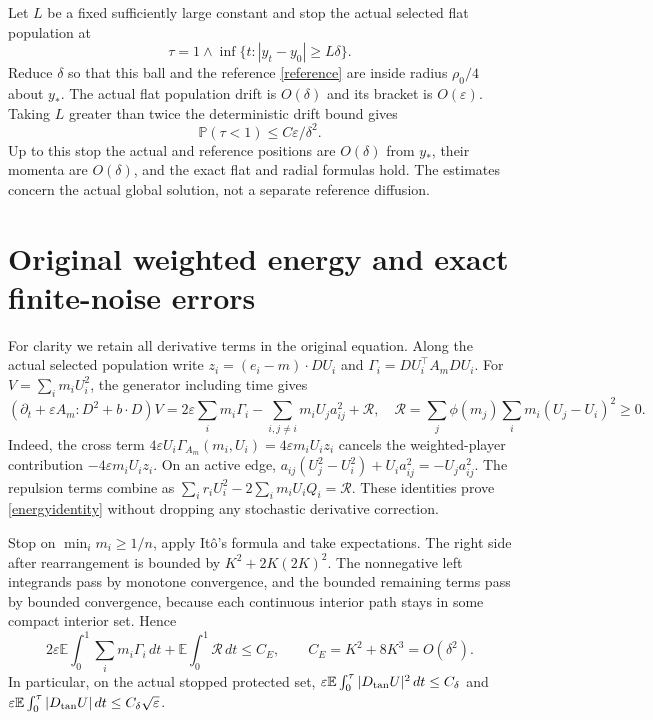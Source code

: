 \documentclass[11pt,a4paper]{article}
\newcommand{\E}{\mathbb E}
\newcommand{\PP}{\mathbb P}
\newcommand{\dt}{\,dt}
\begin{document}
Let $L$ be a fixed sufficiently large constant and stop the actual
selected flat population at
\[
 \tau=1\wedge\inf\{t:|y_t-y_0|\geq L\delta\}.
\]
Reduce $\delta$ so that this ball and the reference
\eqref{reference} are inside radius $\rho_0/4$ about $y_*$.
The actual flat population drift is $O(\delta)$ and its bracket is
$O(\varepsilon)$. Taking $L$ greater than twice the deterministic
drift bound gives
\begin{equation}\label{localexit}
 \PP(\tau<1)\leq C\varepsilon/\delta^2.
\end{equation}
Up to this stop the actual and reference positions are $O(\delta)$
from $y_*$, their momenta are $O(\delta)$, and the exact flat and
radial formulas hold. The estimates concern the actual global
solution, not a separate reference diffusion.

\section{Original weighted energy and exact finite-noise errors}
For clarity we retain all derivative terms in the original equation.
Along the actual selected population write
$z_i=(e_i-m)\cdot DU_i$ and
$\Gamma_i=DU_i^\top A_mDU_i$. For
$V=\sum_i m_iU_i^2$, the generator including time gives
\begin{equation}\label{energyidentity}
 (\partial_t+\varepsilon A_m:D^2+b\cdot D)V
 =2\varepsilon\sum_i m_i\Gamma_i
   -\sum_{i,j\ne i}m_iU_j a_{ij}^2
   +\mathcal R,
 \quad
 \mathcal R=\sum_j\phi(m_j)\sum_i m_i(U_j-U_i)^2\geq0.
\end{equation}
Indeed, the cross term
$4\varepsilon U_i\Gamma_{A_m}(m_i,U_i)
=4\varepsilon m_iU_iz_i$ cancels the weighted-player contribution
$-4\varepsilon m_iU_iz_i$. On an active edge,
$a_{ij}(U_j^2-U_i^2)+U_ia_{ij}^2=-U_ja_{ij}^2$.
The repulsion terms combine as
$\sum_i r_iU_i^2-2\sum_i m_iU_iQ_i=\mathcal R$.
These identities prove \eqref{energyidentity} without dropping
any stochastic derivative correction.

Stop on $\min_i m_i\geq1/n$, apply It\^o's formula and take expectations.
The right side after rearrangement is bounded by
$K^2+2K(2K)^2$. The nonnegative left integrands pass by monotone
convergence, and the bounded remaining terms pass by bounded
convergence, because each continuous interior path stays in some
compact interior set. Hence
\begin{equation}\label{energybound}
 2\varepsilon\E\int_0^1\sum_i m_i\Gamma_i\dt
          +\E\int_0^1\mathcal R\dt\leq C_E,
 \qquad C_E=K^2+8K^3=O(\delta^2).
\end{equation}
In particular, on the actual stopped protected set,
$\varepsilon\E\int_0^\tau|D_{\rm tan}U|^2\dt\leq C_\delta$ and
$\varepsilon\E\int_0^\tau|D_{\rm tan}U|\dt\leq C_\delta\sqrt\varepsilon$.
\end{document}
